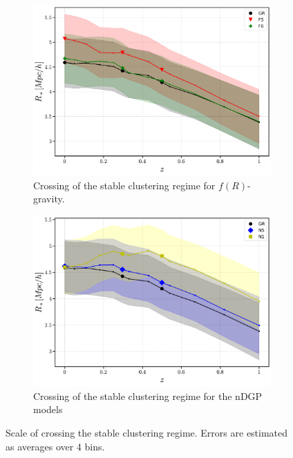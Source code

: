 \documentclass[%
 reprint,
groupedaddress,
nofootinbib,
nobibnotes,
 amsmath,amssymb,
 aps,
]{revtex4-2}
\newcommand{\<}{\langle}
\renewcommand{\>}{\rangle}
\newcommand{\MJ}[1]{\textcolor{WildStrawberry}{[Mariana]: #1}}
\begin{document}


\begin{figure}
    \centering
    \begin{subfigure}[c]{0.45\textwidth}
         \includegraphics[width=\textwidth]{figs/StableClustering-z_cut_minor_fixed_fofr_err.pdf}
         \caption{Crossing of the stable clustering regime for $f(R)$-gravity.}\label{fig:rstar_fofr}
     \end{subfigure}
     \begin{subfigure}[c]{0.45\textwidth}
         \includegraphics[width=\textwidth]{figs/StableClustering-z_cut_minor_fixed_ndgp_err.pdf}
         \caption{Crossing of the stable clustering regime for the nDGP models}\label{fig:rstar_ndgp}
     \end{subfigure}
    \caption{Scale of crossing the stable clustering regime. Errors are estimated as averages over 4 bins.}\label{fig:rstar}
\end{figure}
\end{document}
